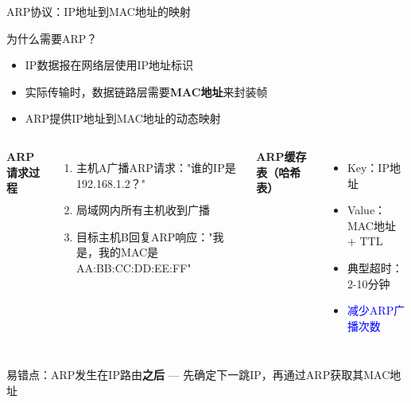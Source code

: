 \documentclass[10pt, aspectratio=169]{beamer}
\begin{document}
\begin{frame}{ARP协议：IP地址到MAC地址的映射}
    \begin{block}{为什么需要ARP？}
        \begin{itemize}
            \item IP数据报在网络层使用IP地址标识
            \item 实际传输时，数据链路层需要\textbf{MAC地址}来封装帧
            \item ARP提供IP地址到MAC地址的动态映射
        \end{itemize}
    \end{block}
    \vspace{0.3em}
    \begin{columns}[T]
        \textbf{ARP请求过程}
        \begin{enumerate}
            \item 主机A广播ARP请求："谁的IP是192.168.1.2？"
            \item 局域网内所有主机收到广播
            \item 目标主机B回复ARP响应："我是，我的MAC是AA:BB:CC:DD:EE:FF"
        \end{enumerate}
        \textbf{ARP缓存表（哈希表）}
        \begin{itemize}
            \item Key：IP地址
            \item Value：MAC地址 + TTL
            \item 典型超时：2-10分钟
            \item \textcolor{blue}{减少ARP广播次数}
        \end{itemize}
    \end{columns}
    \vspace{0.3em}
    \alert{易错点：ARP发生在IP路由\textbf{之后} --- 先确定下一跳IP，再通过ARP获取其MAC地址}
\end{frame}
\end{document}
